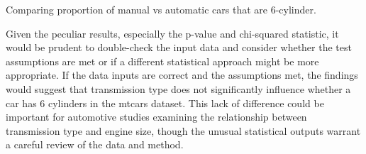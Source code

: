 \documentclass[
]{book}
\newenvironment{Shaded}{\begin{snugshade}}{\end{snugshade}}
\newcommand{\CommentTok}[1]{\textcolor[rgb]{0.56,0.35,0.01}{\textit{#1}}}
\newcommand{\DecValTok}[1]{\textcolor[rgb]{0.00,0.00,0.81}{#1}}
\newcommand{\FunctionTok}[1]{\textcolor[rgb]{0.13,0.29,0.53}{\textbf{#1}}}
\newcommand{\NormalTok}[1]{#1}
\newcommand{\OtherTok}[1]{\textcolor[rgb]{0.56,0.35,0.01}{#1}}
\newcommand{\SpecialCharTok}[1]{\textcolor[rgb]{0.81,0.36,0.00}{\textbf{#1}}}
\begin{document}
Comparing proportion of manual vs automatic cars that are 6-cylinder.

\begin{Shaded}
\end{Shaded}

Given the peculiar results, especially the p-value and chi-squared statistic, it would be prudent to double-check the input data and consider whether the test assumptions are met or if a different statistical approach might be more appropriate. If the data inputs are correct and the assumptions met, the findings would suggest that transmission type does not significantly influence whether a car has 6 cylinders in the mtcars dataset. This lack of difference could be important for automotive studies examining the relationship between transmission type and engine size, though the unusual statistical outputs warrant a careful review of the data and method.
\end{document}
